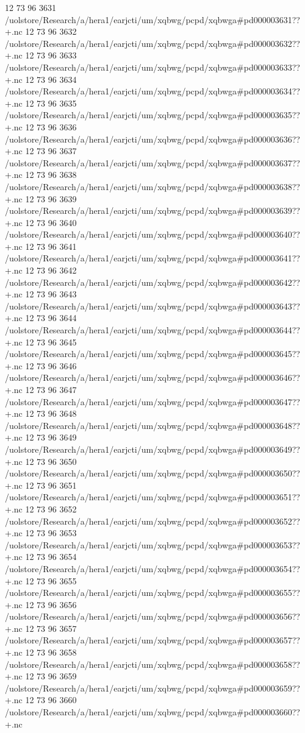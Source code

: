 12 73 96
3631
/uolstore/Research/a/hera1/earjcti/um/xqbwg/pcpd/xqbwga#pd000003631??+.nc
12 73 96
3632
/uolstore/Research/a/hera1/earjcti/um/xqbwg/pcpd/xqbwga#pd000003632??+.nc
12 73 96
3633
/uolstore/Research/a/hera1/earjcti/um/xqbwg/pcpd/xqbwga#pd000003633??+.nc
12 73 96
3634
/uolstore/Research/a/hera1/earjcti/um/xqbwg/pcpd/xqbwga#pd000003634??+.nc
12 73 96
3635
/uolstore/Research/a/hera1/earjcti/um/xqbwg/pcpd/xqbwga#pd000003635??+.nc
12 73 96
3636
/uolstore/Research/a/hera1/earjcti/um/xqbwg/pcpd/xqbwga#pd000003636??+.nc
12 73 96
3637
/uolstore/Research/a/hera1/earjcti/um/xqbwg/pcpd/xqbwga#pd000003637??+.nc
12 73 96
3638
/uolstore/Research/a/hera1/earjcti/um/xqbwg/pcpd/xqbwga#pd000003638??+.nc
12 73 96
3639
/uolstore/Research/a/hera1/earjcti/um/xqbwg/pcpd/xqbwga#pd000003639??+.nc
12 73 96
3640
/uolstore/Research/a/hera1/earjcti/um/xqbwg/pcpd/xqbwga#pd000003640??+.nc
12 73 96
3641
/uolstore/Research/a/hera1/earjcti/um/xqbwg/pcpd/xqbwga#pd000003641??+.nc
12 73 96
3642
/uolstore/Research/a/hera1/earjcti/um/xqbwg/pcpd/xqbwga#pd000003642??+.nc
12 73 96
3643
/uolstore/Research/a/hera1/earjcti/um/xqbwg/pcpd/xqbwga#pd000003643??+.nc
12 73 96
3644
/uolstore/Research/a/hera1/earjcti/um/xqbwg/pcpd/xqbwga#pd000003644??+.nc
12 73 96
3645
/uolstore/Research/a/hera1/earjcti/um/xqbwg/pcpd/xqbwga#pd000003645??+.nc
12 73 96
3646
/uolstore/Research/a/hera1/earjcti/um/xqbwg/pcpd/xqbwga#pd000003646??+.nc
12 73 96
3647
/uolstore/Research/a/hera1/earjcti/um/xqbwg/pcpd/xqbwga#pd000003647??+.nc
12 73 96
3648
/uolstore/Research/a/hera1/earjcti/um/xqbwg/pcpd/xqbwga#pd000003648??+.nc
12 73 96
3649
/uolstore/Research/a/hera1/earjcti/um/xqbwg/pcpd/xqbwga#pd000003649??+.nc
12 73 96
3650
/uolstore/Research/a/hera1/earjcti/um/xqbwg/pcpd/xqbwga#pd000003650??+.nc
12 73 96
3651
/uolstore/Research/a/hera1/earjcti/um/xqbwg/pcpd/xqbwga#pd000003651??+.nc
12 73 96
3652
/uolstore/Research/a/hera1/earjcti/um/xqbwg/pcpd/xqbwga#pd000003652??+.nc
12 73 96
3653
/uolstore/Research/a/hera1/earjcti/um/xqbwg/pcpd/xqbwga#pd000003653??+.nc
12 73 96
3654
/uolstore/Research/a/hera1/earjcti/um/xqbwg/pcpd/xqbwga#pd000003654??+.nc
12 73 96
3655
/uolstore/Research/a/hera1/earjcti/um/xqbwg/pcpd/xqbwga#pd000003655??+.nc
12 73 96
3656
/uolstore/Research/a/hera1/earjcti/um/xqbwg/pcpd/xqbwga#pd000003656??+.nc
12 73 96
3657
/uolstore/Research/a/hera1/earjcti/um/xqbwg/pcpd/xqbwga#pd000003657??+.nc
12 73 96
3658
/uolstore/Research/a/hera1/earjcti/um/xqbwg/pcpd/xqbwga#pd000003658??+.nc
12 73 96
3659
/uolstore/Research/a/hera1/earjcti/um/xqbwg/pcpd/xqbwga#pd000003659??+.nc
12 73 96
3660
/uolstore/Research/a/hera1/earjcti/um/xqbwg/pcpd/xqbwga#pd000003660??+.nc
